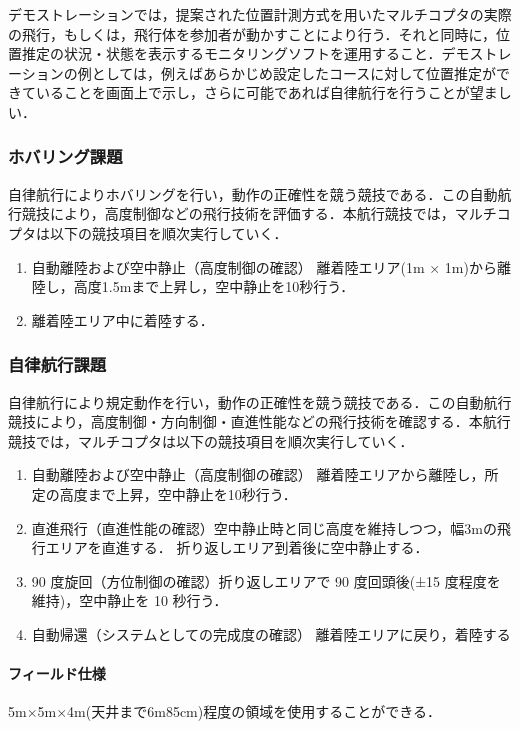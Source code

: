 \documentclass[submit]{ipsj}
\begin{document}
デモストレーションでは，提案された位置計測方式を用いたマルチコプタの実際の飛行，もしくは，飛行体を参加者が動かすことにより行う．それと同時に，位置推定の状況・状態を表示するモニタリングソフトを運用すること．デモストレーションの例としては，例えばあらかじめ設定したコースに対して位置推定ができていることを画面上で示し，さらに可能であれば自律航行を行うことが望ましい．

\subsubsection{ホバリング課題}

自律航行によりホバリングを行い，動作の正確性を競う競技である．この自動航行競技により，高度制御などの飛行技術を評価する．本航行競技では，マルチコプタは以下の競技項目を順次実行していく．
\begin{enumerate}
\item 自動離陸および空中静止（高度制御の確認） 離着陸エリア(1m $\times$ 1m)から離陸し，高度1.5mまで上昇し，空中静止を10秒行う．
\item 離着陸エリア中に着陸する．
\end{enumerate}

\subsubsection{自律航行課題}
自律航行により規定動作を行い，動作の正確性を競う競技である．この自動航行競技により，高度制御・方向制御・直進性能などの飛行技術を確認する．本航行競技では，マルチコプタは以下の競技項目を順次実行していく．

\begin{enumerate}
\item 自動離陸および空中静止（高度制御の確認） 離着陸エリアから離陸し，所定の高度まで上昇，空中静止を10秒行う．
\item 直進飛行（直進性能の確認）空中静止時と同じ高度を維持しつつ，幅3mの飛行エリアを直進する． 折り返しエリア到着後に空中静止する．
\item 90 度旋回（方位制御の確認）折り返しエリアで 90 度回頭後(±15 度程度を維持)，空中静止を 10 秒行う．
\item 自動帰還（システムとしての完成度の確認） 離着陸エリアに戻り，着陸する
\end{enumerate}

\paragraph*{フィールド仕様}
5m×5m×4m(天井まで6m85cm)程度の領域を使用することができる．
\end{document}
